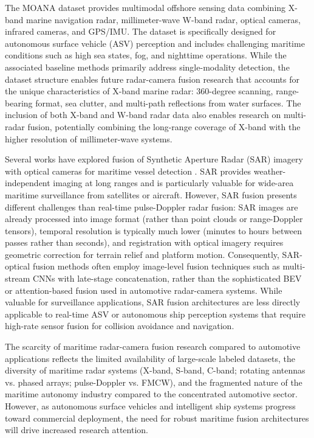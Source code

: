 The MOANA dataset \cite{Jang2024MOANA} provides multimodal offshore sensing data combining X-band marine navigation radar, millimeter-wave W-band radar, optical cameras, infrared cameras, and GPS/IMU. The dataset is specifically designed for autonomous surface vehicle (ASV) perception and includes challenging maritime conditions such as high sea states, fog, and nighttime operations. While the associated baseline methods primarily address single-modality detection, the dataset structure enables future radar-camera fusion research that accounts for the unique characteristics of X-band marine radar: 360-degree scanning, range-bearing format, sea clutter, and multi-path reflections from water surfaces. The inclusion of both X-band and W-band radar data also enables research on multi-radar fusion, potentially combining the long-range coverage of X-band with the higher resolution of millimeter-wave systems.

Several works have explored fusion of Synthetic Aperture Radar (SAR) imagery with optical cameras for maritime vessel detection \cite{Zhou2022DeepRadar}. SAR provides weather-independent imaging at long ranges and is particularly valuable for wide-area maritime surveillance from satellites or aircraft. However, SAR fusion presents different challenges than real-time pulse-Doppler radar fusion: SAR images are already processed into image format (rather than point clouds or range-Doppler tensors), temporal resolution is typically much lower (minutes to hours between passes rather than seconds), and registration with optical imagery requires geometric correction for terrain relief and platform motion. Consequently, SAR-optical fusion methods often employ image-level fusion techniques such as multi-stream CNNs with late-stage concatenation, rather than the sophisticated BEV or attention-based fusion used in automotive radar-camera systems. While valuable for surveillance applications, SAR fusion architectures are less directly applicable to real-time ASV or autonomous ship perception systems that require high-rate sensor fusion for collision avoidance and navigation.

The scarcity of maritime radar-camera fusion research compared to automotive applications reflects the limited availability of large-scale labeled datasets, the diversity of maritime radar systems (X-band, S-band, C-band; rotating antennas vs. phased arrays; pulse-Doppler vs. FMCW), and the fragmented nature of the maritime autonomy industry compared to the concentrated automotive sector. However, as autonomous surface vehicles and intelligent ship systems progress toward commercial deployment, the need for robust maritime fusion architectures will drive increased research attention.

